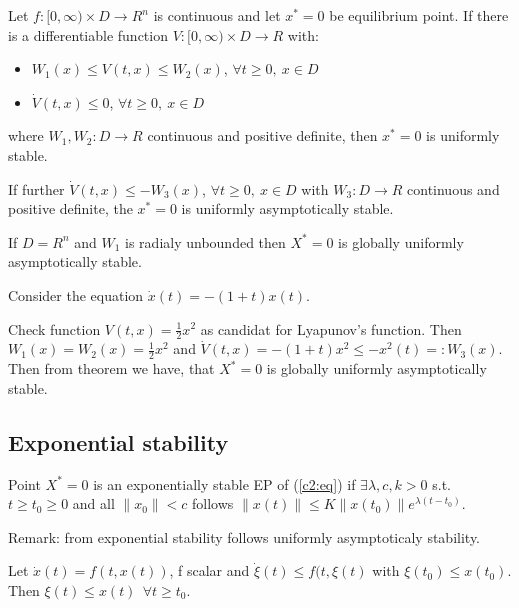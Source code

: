 \begin{Theorem}
 Let $f:[0,\infty)\times D\to R^n$ is continuous and let $x^*=0$ be equilibrium point.
 If there is a differentiable function $V:[0,\infty)\times D\to R$ with:
 \begin{itemize}
  \item $W_1(x) \le V(t,x) \le W_2(x)$, $\forall t\ge0,\ x\in D$
  \item $\dot V(t,x)\le 0$, $\forall t \ge0,\ x\in D$
 \end{itemize}
 where $W_1,W_2:D \to R$ continuous and positive definite, then $x^*=0$ is uniformly stable.

 If further $\dot V(t,x) \le -W_3(x)$, $\forall t\ge0,\ x\in D$ with $W_3:D \to R$
 continuous and positive definite, the $x^*=0$ is uniformly asymptotically stable.

 If $D=R^n$ and $W_1$ is radialy unbounded then $X^*=0$ is globally uniformly
 asymptotically stable.
\end{Theorem}

\begin{Example}
 Consider the equation $\dot x(t) = -(1+t)x(t)$.

 Check function $V(t,x)=\frac{1}{2}x^2$ as candidat for Lyapunov's function. Then
 $W_1(x)=W_2(x)=\frac{1}{2}x^2$ and $\dot V(t,x)=-(1+t)x^2 \le -x^2(t)=: W_3(x)$.
 Then from theorem we have, that $X^*=0$  is globally uniformly asymptotically stable.
\end{Example}


\subsection{Exponential stability}

\begin{Definition}
 Point $X^*=0$ is an exponentially stable EP of (\ref{c2:eq}) if $\exists \lambda,c,k>0$
 s.t. $t \ge t_0 \ge 0$ and all $\|x_0\|<c$ follows
 $\|x(t)\|\le K\|x(t_0)\|e^{\lambda(t-t_0)}$.
\end{Definition}

Remark: from exponential stability follows uniformly asymptoticaly stability.

\begin{Lemma}
 Let $\dot x(t)=f(t,x(t))$, f scalar and $\dot \xi(t)\le f(t, \xi(t)$ with 
 $\xi (t_0)\le x(t_0)$. Then $\xi (t) \le x(t)\ \ \forall t\ge t_0$.
\end{Lemma}

